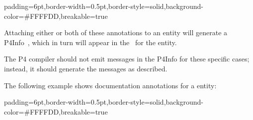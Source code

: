 \documentclass[11pt]{article}
\begin{document}
{%
\begin{mdbmargintb}{6pt}{6pt}%
\begin{mdblock}{padding=6pt,border-width=0.5pt,border-style=solid,background-color=\#FFFFDD,breakable=true}%
\begin{mdpre}%
\end{mdpre}%
\end{mdblock}%
\end{mdbmargintb}%

\noindent{}Attaching either or both of these annotations to an entity will generate a
P4Info~, which in turn will
appear in the~ for the entity.%

The P4 compiler should not emit  messages in the P4Info for these
specific cases; instead, it should generate the  messages as
described.%

The following example shows documentation annotations for a  entity:%

\begin{mdbmargintb}{6pt}{6pt}%
\begin{mdblock}{padding=6pt,border-width=0.5pt,border-style=solid,background-color=\#FFFFDD,breakable=true}%
\begin{mdpre}%
\end{mdpre}%
\end{mdblock}%
\end{mdbmargintb}%

}
\end{document}
